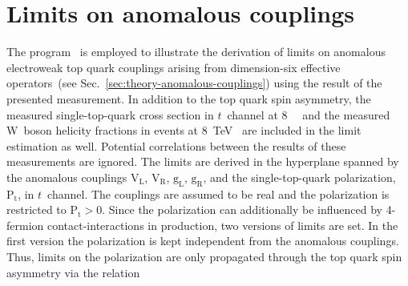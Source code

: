 
\section{Limits on anomalous couplings}

The \TOPFIT[format=hyperbf] program~\cite{AguilarSaavedra:2010nx,topfit} is employed to illustrate the derivation of limits on anomalous electroweak top quark couplings arising from dimension-six effective operators~(see Sec.~\ref{sec:theory-anomalous-couplings}) using the result of the presented measurement. In addition to the top quark spin asymmetry, the measured single-top-quark cross section in $t$~channel at 8~\TeV~\cite{Khachatryan:2014iya} and the measured W~boson helicity fractions in \ttbar events at 8~TeV~\cite{Khachatryan:2016fky} are included in the limit estimation as well. Potential correlations between the results of these measurements are ignored. The limits are derived in the hyperplane spanned by the anomalous couplings $\mathrm{V}_\mathrm{L}$, $\mathrm{V}_\mathrm{R}$, $\mathrm{g}_\mathrm{L}$, $\mathrm{g}_\mathrm{R}$, and the single-top-quark polarization, $\mathrm{P}_\mathrm{t}$, in $t$~channel. The couplings are assumed to be real and the polarization is restricted to $\mathrm{P}_\mathrm{t}>0$. Since the polarization can additionally be influenced by 4-fermion contact-interactions in production, two versions of limits are set. In the first version the polarization is kept independent from the anomalous couplings. Thus, limits on the polarization are only propagated through the top quark spin asymmetry via the relation


